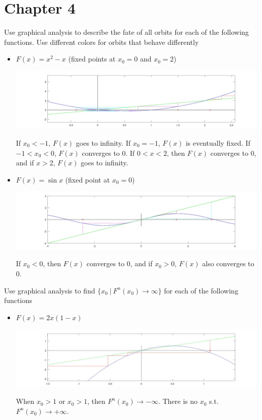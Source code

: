 \documentclass[12pt]{article}
\author{Warren Atkison}
\date{\today}
\newenvironment{exercise}[2][Exercise]{\begin{trivlist}
\item[\hskip \labelsep {\bfseries #1} \hskip \labelsep {\bfseries #2.}]}{\end{trivlist}}
\begin{document}
\fancyhf{}
\fancyhead[R]{\today}
\fancyfoot[R]{\thepage}

\section*{Chapter 4}

\begin{exercise}{1} Use graphical analysis to describe the fate of all orbits for each of the following functions. Use different colors for orbits that behave differently
\end{exercise}
\begin{itemize}
	\item[f.] $F(x) = x^2 - x$ (fixed points at $x_0 = 0$ and $x_0 = 2$)
		\begin{center}
			\includegraphics[scale=0.23]{Fig1.4.1f.jpg}
		\end{center}
		If $x_0 < -1$, $F(x)$ goes to infinity. If $x_0 = -1$, $F(x)$ is eventually fixed. If $-1 < x_0 < 0$, $F(x)$ converges to 0. If $0 < x < 2$, then $F(x)$ converges to 0, and if $x > 2$, $F(x)$ goes to infinity.
	\item[g.] $F(x) = \sin x$ (fixed point at $x_0 = 0$)
		\begin{center}
			\includegraphics[scale=0.23]{Fig1.4.1g.jpg}
		\end{center}
		If $x_0 < 0$, then $F(x)$ converges to 0, and if $x_0 > 0$, $F(x)$ also converges to 0.
\end{itemize}
\begin{exercise}{2} Use graphical analysis to find $\{x_0 ~|~ F^{n}(x_0) \to \infty\}$ for each of the following functions	
\end{exercise}
\begin{itemize}
	\item[a.] $F(x) = 2x(1-x)$
		\begin{center}
			\includegraphics[scale=0.23]{Fig1.4.2a.jpg}
		\end{center}
		When $x_0 > 1$ or $x_0 > 1$, then $F^n(x_0) \to -\infty$. There is no $x_0$ s.t. $F^n(x_0) \to +\infty$.
\end{itemize}
\end{document}
